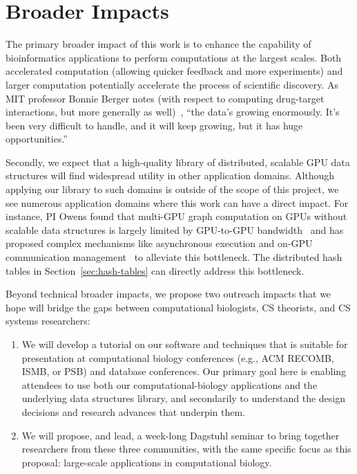 \section{Broader Impacts}
\label{broadimpacts}

The primary broader impact of this work is to enhance the capability of bioinformatics applications to perform computations at the largest scales. Both accelerated computation (allowing quicker feedback and more experiments) and larger computation potentially accelerate the process of scientific discovery. As MIT professor Bonnie Berger notes (with respect to computing drug-target interactions, but more generally as well)~\cite{Krasilnikova:2022:DDD}, ``the data's growing enormously. It's been very difficult to handle, and it will keep growing, but it has huge opportunities.'' 

Secondly, we expect that a high-quality library of distributed, scalable GPU data structures will find widespread utility in other application domains. Although applying our library to such domains is outside of the scope of this project, we see numerous application domains where this work can have a direct impact. For instance, PI Owens found that multi-GPU graph computation on GPUs without scalable data structures is largely limited by GPU-to-GPU bandwidth~\cite{Pan:2017:MGA} and has proposed complex mechanisms like asynchronous execution and on-GPU communication management~\cite{Chen:2022:SIP} to alleviate this bottleneck. The distributed hash tables in Section~\ref{sec:hash-tables} can directly address this bottleneck.

Beyond technical broader impacts, we propose two outreach impacts that we hope will bridge the gaps between computational biologists, CS theorists, and CS systems researchers:

\begin{enumerate}[noitemsep]
  \item We will develop a tutorial on our software and techniques that is suitable for presentation at computational biology conferences (e.g., ACM RECOMB, ISMB, or PSB) and database conferences. Our primary goal here is enabling attendees to use both our computational-biology applications and the underlying data structures library, and secondarily to understand the design decisions and research advances that underpin them.
  \item We will propose, and lead, a week-long Dagstuhl seminar to bring together researchers from these three communities, with the same specific focus as this proposal: large-scale applications in computational biology.
\end{enumerate}

